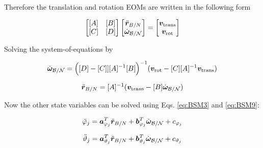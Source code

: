 Therefore the translation and rotation EOMs are written in the following form

\begin{equation}
	\begin{bmatrix}
		[A] & [B]\\
		[C] & [D]
	\end{bmatrix} \begin{bmatrix}
		\ddot{\bm r}_{B/N}\\
		\dot{\bm\omega}_{\cal B/N}
	\end{bmatrix} = \begin{bmatrix}
		\bm v_{\text{trans}}\\
		\bm v_{\text{rot}}
	\end{bmatrix}
\end{equation}

Solving the system-of-equations by

\begin{equation}
	\dot{\bm\omega}_{\cal B/N} = \Big([D] - [C]][A]^{-1}[B]\Big)^{-1}(\bm v_{\text{rot}} - [C][A]^{-1}\bm v_{\text{trans}})
	\label{eq:finalsystemomega}
\end{equation}

\begin{equation}
	\ddot{\bm r}_{B/N} = [A]^{-1} (\bm v_{\text{trans}} - [B]\dot{\bm\omega}_{\cal B/N})
	\label{eq:finalsystemr}
\end{equation}

Now the other state variables can be solved using Eqs. \eqref{eq:BSM3} and \eqref{eq:BSM9}:

\begin{equation}
	\ddot{\varphi}_j  = \bm a_{\varphi_j}^T \ddot{\bm{r}}_{B/N} + \bm b_{\varphi_j}^T \dot{\bm\omega}_{\cal B/N} +c_{\varphi_j}
\end{equation}

\begin{equation}
	\ddot \vartheta_j = \bm a_{\vartheta_j}^T \ddot{\bm r}_{B/N} + \bm b_{\vartheta_j}^T \dot{\bm\omega}_{\cal B/N} + c_{\vartheta_j}
\end{equation}\\
